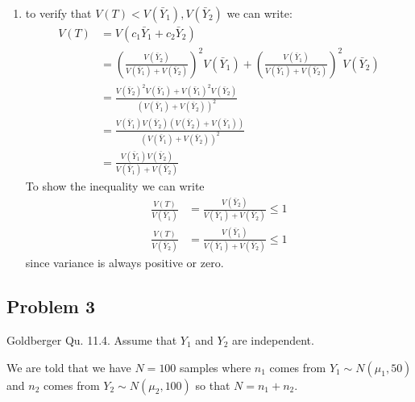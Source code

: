 \documentclass{article}
\newcommand{\1}{\mathbf{1}}
\begin{document}
\begin{enumerate}
     \item to verify that $V(T) < V(\bar Y_1), V(\bar Y_2)$ we can write: 
     \begin{align*}
        V(T) &=  V(c_1\bar Y_1 + c_2 \bar Y_2) \\
        &= \left(\frac{V(\bar Y_2)}{V(\bar Y_1) + V(\bar Y_2)}\right)^2 V(\bar Y_1)  +  \left(\frac{V(\bar Y_1)}{V(\bar Y_1) + V(\bar Y_2)} \right)^2 V(\bar Y_2) \\
        &= \frac{V(\bar Y_2)^2 V(\bar Y_1) + V(\bar Y_1)^2V(\bar Y_2)}{\left(V(\bar Y_1) + V(\bar Y_2)\right)^2} \\
        &= \frac{V(\bar Y_1)V(\bar Y_2)\left(V(\bar Y_2) + V(\bar Y_1)\right)}{\left(V(\bar Y_1) + V(\bar Y_2)\right)^2} \\
        &= \frac{V(\bar Y_1)V(\bar Y_2)}{V(\bar Y_1) + V(\bar Y_2)} 
    \end{align*}
    To show the inequality we can write
    \begin{align*}
        \frac{V(T)}{V(\bar Y_1)} &= \frac{V(\bar Y_2)}{V(\bar Y_1) + V(\bar Y_2)} \leq 1 \\
        \frac{V(T)}{V(\bar Y_2)} &= \frac{V(\bar Y_1)}{V(\bar Y_1) + V(\bar Y_2)} \leq 1 
    \end{align*}
    since variance is always positive or zero. 
 \end{enumerate}
 


\newpage
\subsection*{Problem 3}
Goldberger Qu. 11.4. Assume that $Y_1$ and $Y_2$ are independent.

We are told that we have $N=100$ samples where $n_1$ comes from $Y_1\sim N(\mu_1, 50)$ and $n_2$ comes from $Y_2\sim N(\mu_2, 100)$ so that $N=n_1+n_2$. 
\end{document}
